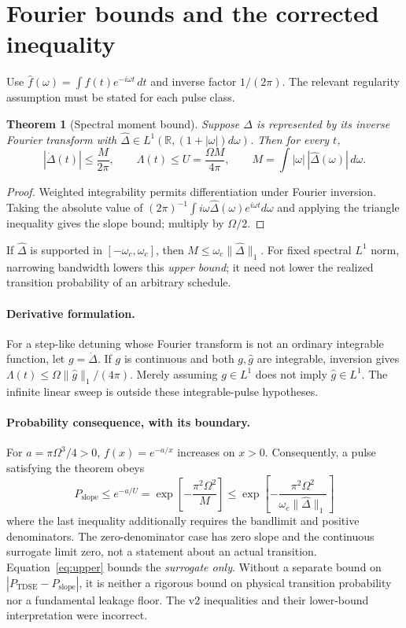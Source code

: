 \documentclass[11pt]{article}
\newtheorem{theorem}{Theorem}
\begin{document}
\section{Fourier bounds and the corrected inequality}
Use $\hat f(\omega)=\int f(t)e^{-i\omega t}\,dt$ and inverse factor $1/(2\pi)$.
The relevant regularity assumption must be stated for each pulse class.

\begin{theorem}[Spectral moment bound]
Suppose $\Delta$ is represented by its inverse Fourier transform with
$\hat\Delta\in L^1(\mathbb R,(1+|\omega|)d\omega)$. Then for every $t$,
\begin{equation}
 |\dot\Delta(t)|\le\frac{M}{2\pi},\qquad
 \Lambda(t)\le U=\frac{\Omega M}{4\pi},\qquad
 M=\int|\omega|\,|\hat\Delta(\omega)|\,d\omega. \label{eq:fourier}
\end{equation}
\end{theorem}
\begin{proof}
Weighted integrability permits differentiation under Fourier inversion.
Taking the absolute value of
$(2\pi)^{-1}\int i\omega\hat\Delta(\omega)e^{i\omega t}d\omega$
and applying the triangle inequality gives the slope bound; multiply by
$\Omega/2$.
\end{proof}
If $\hat\Delta$ is supported in $[-\omega_c,\omega_c]$, then
$M\le\omega_c\|\hat\Delta\|_1$. For fixed spectral $L^1$ norm, narrowing
bandwidth lowers this \emph{upper bound}; it need not lower the realized
transition probability of an arbitrary schedule.

\paragraph{Derivative formulation.}
For a step-like detuning whose Fourier transform is not an ordinary integrable
function, let $g=\dot\Delta$. If $g$ is continuous and both $g,\hat g$ are
integrable, inversion gives $\Lambda(t)\le\Omega\|\hat g\|_1/(4\pi)$.
Merely assuming $g\in L^1$ does not imply $\hat g\in L^1$.
The infinite linear sweep is outside these integrable-pulse hypotheses.

\paragraph{Probability consequence, with its boundary.}
For $a=\pi\Omega^3/4>0$, $f(x)=e^{-a/x}$ increases on $x>0$.
Consequently, a pulse satisfying the theorem obeys
\begin{equation}
 P_{\mathrm{slope}}\le e^{-a/U}
   =\exp\!\left[-\frac{\pi^2\Omega^2}{M}\right]
   \le\exp\!\left[-\frac{\pi^2\Omega^2}{\omega_c\|\hat\Delta\|_1}\right]
 \label{eq:upper}
\end{equation}
where the last inequality additionally requires the bandlimit and positive
denominators. The zero-denominator case has zero slope and the continuous
surrogate limit zero, not a statement about an actual transition.
Equation~\eqref{eq:upper} bounds the \emph{surrogate only}. Without a separate
bound on $|P_{\mathrm{TDSE}}-P_{\mathrm{slope}}|$, it is neither a rigorous
bound on physical transition probability nor a fundamental leakage floor.
The v2 inequalities and their lower-bound interpretation were incorrect.
\end{document}
